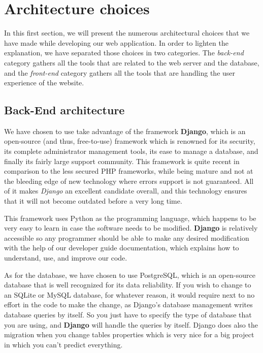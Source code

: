 \section{Architecture choices}
\label{sec:Architecture choices}


In this first section, we will present the numerous architectural choices that
we have made while developing our web application. In order to lighten the
explanation, we have separated those choices in two categories. The
\textit{back-end} category gathers all the tools that are related
to the web server and the database, and the \textit{front-end} category gathers
all the tools that are handling the user experience of the website.

\subsection{Back-End architecture}

We have chosen to use take advantage of the framework \textbf{Django}, which is
an open-source (and thus, free-to-use) framework which is renowned for its
security, its complete administrator management tools, its ease to manage a
database, and finally its fairly large support community. This framework is quite
recent in comparison to the less secured PHP frameworks, while being mature and
not at the bleeding edge of new technology where errors support is not
guaranteed. All of it makes \textit{Django} an excellent candidate overall, and
this technology ensures that it will not become outdated before a very long
time.\newline

This framework uses Python as the programming language, which happens to be
very easy to learn in case the software needs to be modified. \textbf{Django}
is relatively accessible so any programmer should be able to make any desired
modification with the help of our developer guide documentation, which explains
how to understand, use, and improve our code.\newline

As for the database, we have chosen to use PostgreSQL, which is an open-source
database that is well recognized for its data reliability. If you wish to
change to an SQLite or MySQL database, for whatever reason, it would require
next to no effort in the code to make the change, as Django's database
management writes database queries by itself. So you just have to specify the
type of database that you are using, and \textbf{Django} will handle the
queries by itself. Django does also the migration when you change tables
properties which is very nice for a big project in which you can't predict
everything. \newline

